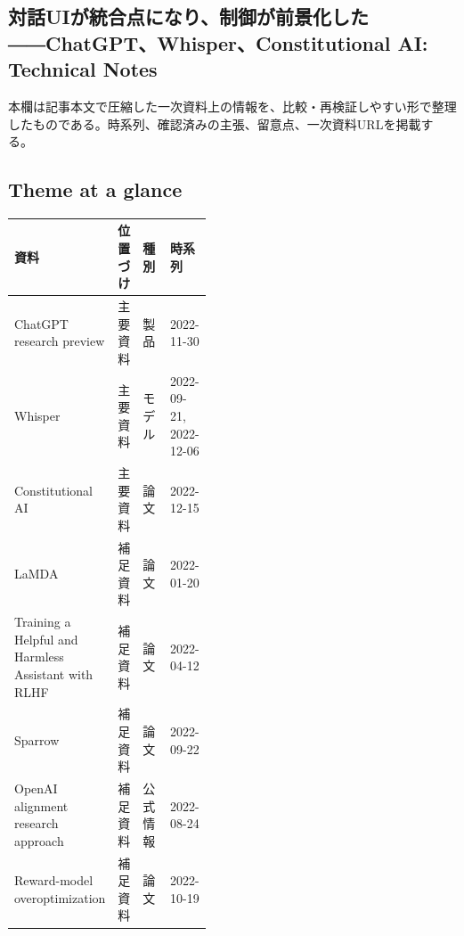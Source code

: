 \subsection*{対話UIが統合点になり、制御が前景化した――ChatGPT、Whisper、Constitutional AI: Technical Notes}
本欄は記事本文で圧縮した一次資料上の情報を、比較・再検証しやすい形で整理したものである。時系列、確認済みの主張、留意点、一次資料URLを掲載する。
\smallskip
{}\par
\medskip
\subsection*{Theme at a glance}
\begin{center}
\footnotesize
\begin{tabularx}{\linewidth}{@{}p{0.20\linewidth}p{0.10\linewidth}p{0.14\linewidth}X@{}}
\toprule
資料 & 位置づけ & 種別 & 時系列 \\
\midrule
ChatGPT research preview & 主要資料 & 製品 & 2022-11-30 \\
Whisper & 主要資料 & モデル & 2022-09-21, 2022-12-06 \\
Constitutional AI & 主要資料 & 論文 & 2022-12-15 \\
LaMDA & 補足資料 & 論文 & 2022-01-20 \\
Training a Helpful and Harmless Assistant with RLHF & 補足資料 & 論文 & 2022-04-12 \\
Sparrow & 補足資料 & 論文 & 2022-09-22 \\
OpenAI alignment research approach & 補足資料 & 公式情報 & 2022-08-24 \\
Reward-model overoptimization & 補足資料 & 論文 & 2022-10-19 \\
\bottomrule
\end{tabularx}
\end{center}
\normalsize

